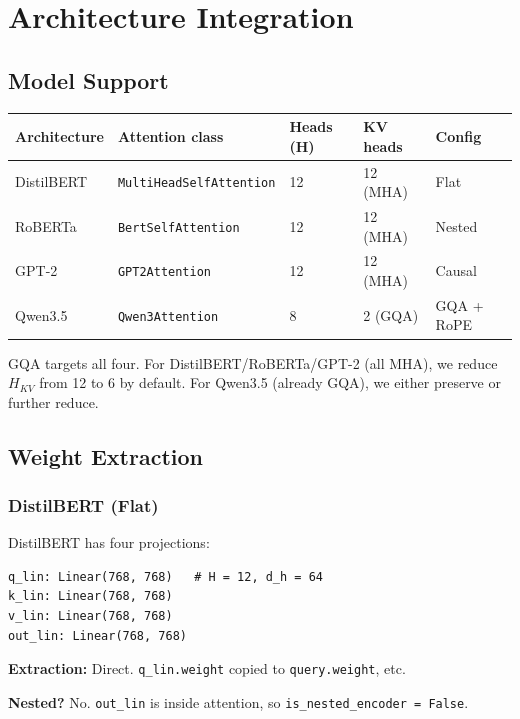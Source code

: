 
\section{Architecture Integration}

\subsection{Model Support}

\begin{table}[H]
\centering
\small
\begin{tabular}{lllll}
\toprule
\textbf{Architecture} & \textbf{Attention class} & \textbf{Heads (H)} & \textbf{KV heads} & \textbf{Config} \\
\midrule
DistilBERT & \texttt{MultiHeadSelfAttention} & 12 & 12 (MHA) & Flat \\
RoBERTa & \texttt{BertSelfAttention} & 12 & 12 (MHA) & Nested \\
GPT-2 & \texttt{GPT2Attention} & 12 & 12 (MHA) & Causal \\
Qwen3.5 & \texttt{Qwen3Attention} & 8 & 2 (GQA) & GQA + RoPE \\
\bottomrule
\end{tabular}
\end{table}

GQA targets all four. For DistilBERT/RoBERTa/GPT-2 (all MHA), we reduce 
$H_{KV}$ from 12 to 6 by default. For Qwen3.5 (already GQA), we either 
preserve or further reduce.

\subsection{Weight Extraction}

\subsubsection{DistilBERT (Flat)}

DistilBERT has four projections:

\begin{lstlisting}
q_lin: Linear(768, 768)   # H = 12, d_h = 64
k_lin: Linear(768, 768)
v_lin: Linear(768, 768)
out_lin: Linear(768, 768)
\end{lstlisting}

\textbf{Extraction:} Direct. \texttt{q\_lin.weight} copied to \texttt{query.weight}, etc.

\textbf{Nested?} No. \texttt{out\_lin} is inside attention, so \texttt{is\_nested\_encoder = False}.

